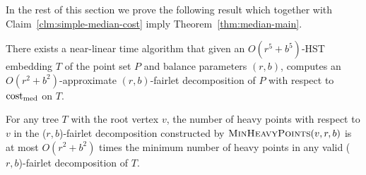 In the rest of this section we prove the following result which together with Claim~\ref{clm:simple-median-cost} imply Theorem~\ref{thm:median-main}.
\begin{lemma}\label{lem:simple-median-guarantee}
There exists a near-linear time algorithm that given an $O(r^5+b^5)$-HST embedding $T$ of the point set $P$ and balance parameters $(r,b)$, computes an $O(r^2+b^2)$-approximate $(r,b)$-fairlet decomposition of $P$ with respect to $\mathrm{cost}_{\mathrm{med}}$ on $T$. 
\end{lemma}



\begin{lemma}\label{lem:constant-heavy-points}
For any tree $T$ with the root vertex $v$, the number of heavy points with respect to $v$ in the ($r,b$)-fairlet decomposition constructed by $\Call{\minHeavy}{v,r,b}$ is at most $O(r^2 + b^2)$ times the minimum number of heavy points in any valid ($r,b$)-fairlet decomposition of $T$. 
\end{lemma}


